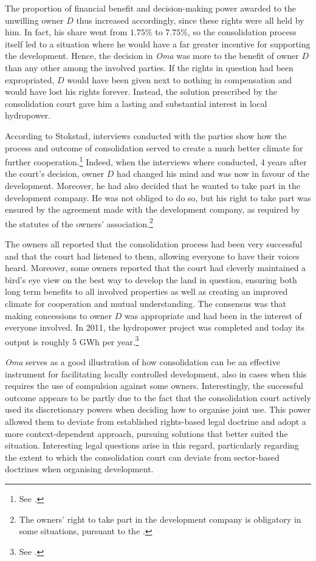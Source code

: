 The proportion of financial benefit and decision-making power awarded to the unwilling owner $D$ thus increased accordingly, since these rights were all held by him. In fact, his share went from $1.75 \%$ to $7.75 \%$, so the consolidation process itself led to a situation where he would have a far greater incentive for supporting the development. Hence, the decision in \emph{Oma} was more to the benefit of owner $D$ than any other among the involved parties. If the rights in question had been expropriated, $D$ would have been given next to nothing in compensation and would have lost his rights forever. Instead, the solution prescribed by the consolidation court gave him a lasting and substantial interest in local hydropower.

According to Stokstad, interviews conducted with the parties show how the process and outcome of consolidation served to create a much better climate for further cooperation.\footnote{See \cite[44-45]{stokstad11}.} Indeed, when the interviews where conducted, 4 years after the court's decision, owner $D$ had changed his mind and was now in favour of the development. Moreover, he had also decided that he wanted to take part in the development company. He was not obliged to do so, but his right to take part was ensured by the agreement made with the development company, as required by the statutes of the owners' association.\footnote{The owners' right to take part in the development company is obligatory in some situations, pursuant to the \dni\cite[34 b) no 3]{lca79}.}

The owners all reported that the consolidation process had been very successful and that the court had listened to them, allowing everyone to have their voices heard. Moreover, some owners reported that the court had cleverly maintained a bird's eye view on the best way to develop the land in question, ensuring both long term benefits to all involved properties as well as creating an improved climate for cooperation and mutual understanding. The consensus was that making concessions to owner $D$ was appropriate and had been in the interest of everyone involved. In 2011, the hydropower project was completed and today its output is roughly 5 GWh per year.\footnote{See \cite[45]{stokstad11}.}

\emph{Oma} serves as a good illustration of how consolidation can be an effective instrument for facilitating locally controlled development, also in cases when this requires the use of compulsion against some owners. Interestingly, the successful outcome appears to be partly due to the fact that the consolidation court actively used its discretionary powers when deciding how to organise joint use. This power allowed them to deviate from established rights-based legal doctrine and adopt a more context-dependent approach, pursuing solutions that better suited the situation. Interesting legal questions arise in this regard, particularly regarding the extent to which the consolidation court can deviate from sector-based doctrines when organising development.

